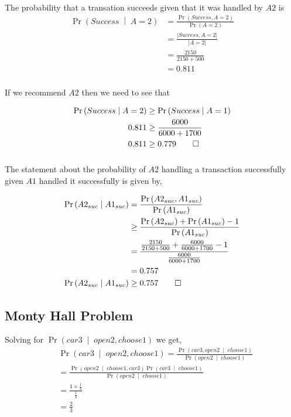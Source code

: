 \documentclass[letterpaper,10pt]{article} %
\newcommand{\pipe}{\;\middle\vert\;}
\newcommand{\condp}[2]{\Pr\left( #1 \pipe #2 \right)}
\newcommand{\pr}[1]{\Pr\left( #1 \right)}
\newcommand{\condpe}[2]{\frac{\pr{#1,#2}}{\pr{#2}}}
\newcommand{\norm}[1]{\left|#1\right|}
\newcommand{\prove}[1]{
\begin{Proof}
\begin{align*}
#1
\end{align*}
\end{Proof}
}
\begin{document}
\subsubsection{}
The probability that a transation succeeds given that it was handled by $A2$ is
\begin{align*}
\condp{Success}{A=2} &= \condpe{Success}{A=2}\\
&= \frac{\norm{Success, A=2}}{\norm{A=2}}\\
&= \frac{2150}{2150+500}\\
&= 0.811
\end{align*}

\subsubsection{}
If we recommend $A2$ then we need to see that
\prove{
\condp{Success}{A=2} &\geq \condp{Success}{A=1}\\
0.811 &\geq \frac{6000}{6000+1700}\\
0.811 &\geq 0.779 \qedhere
}

\subsubsection{}
The statement about the probability of $A2$ handling a transaction successfully given $A1$ handled it successfully is given by,
\prove{
\condp{A2_{suc}}{A1_{suc}} &= \condpe{A2_{suc}}{A1_{suc}}\\
&\geq \frac{\pr{A2_{suc}}+\pr{A1_{suc}}-1}{\pr{A1_{suc}}}\\
&= \frac{\frac{2150}{2150+500}+\frac{6000}{6000+1700}-1}{\frac{6000}{6000+1700}}\\
&= 0.757 \\
\condp{A2_{suc}}{A1_{suc}} &\geq 0.757 \qedhere
}

\subsection{Monty Hall Problem}

Solving for $\pr{car3 \pipe open2, choose1}$ we get,
\begin{align*}
 &\pr{car3 \pipe open2, choose1} = \frac{\condp{car3, open2}{choose1}}{\condp{open2}{choose1}}\\
 &=\frac{\condp{open2}{choose1,car3}\condp{car3}{choose1}}{\condp{open2}{choose1}} \\
 &=\frac{1 \times \tfrac{1}{3}}{\tfrac{1}{2}} \\
 &=\tfrac{2}{3}
\end{align*}
\end{document}
